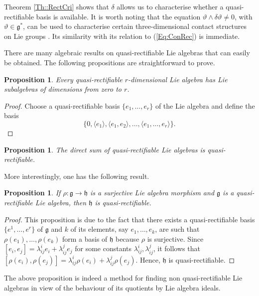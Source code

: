 \documentclass[12pt]{article}
\theoremstyle{plain}
\newtheorem{proposition}[theorem]{Proposition}
\theoremstyle{definition}
\numberwithin{equation}{section}
\begin{document}
Theorem \ref{Th::RectCri} shows that $\delta$ allows us to characterise whether a quasi-rectifiable basis is available. It is worth noting that the equation $\vartheta\wedge \delta \vartheta \neq 0$, with $\vartheta\in \mathfrak{g}^*$, can be used to characterise certain three-dimensional contact structures on Lie groups \cite{LR22}. Its similarity with its relation to (\ref{Eq:ConRec}) is immediate.


There are many algebraic results on quasi-rectifiable Lie algebras that can easily be obtained.  The following propositions are straightforward to prove.

\begin{proposition} Every quasi-rectifiable $r$-dimensional Lie algebra has Lie subalgebras of dimensions from zero to $r$.
\end{proposition}
\begin{proof}
Choose a quasi-rectifiable basis $\{e_1,\ldots,e_r\}$ of the Lie algebra and define the basis
$$
\{0,\langle e_1\rangle, \langle e_1,e_2\rangle,\ldots,\langle e_1,\ldots,e_r\rangle\}.
$$\end{proof}

\begin{proposition} The direct sum of quasi-rectifiable Lie algebras is quasi-rectifiable.
\end{proposition}

More interestingly, one has the following result.

\begin{proposition} If $\rho:\mathfrak{g}\rightarrow \mathfrak{h}$ is a surjective Lie algebra morphism and $\mathfrak{g}$ is a quasi-rectifiable Lie algebra, then $\mathfrak{h}$ is quasi-rectifiable.
\end{proposition}
\begin{proof} This proposition is due to the fact that there exists a quasi-rectifiable basis $\{e^1,\ldots, e^r\}$ of $\mathfrak{g}$ and $k$ of its elements, say $e_1,\ldots,e_k$, are such that $\rho(e_1),\ldots,\rho(e_k)$ form a basis of $\mathfrak{h}$ because $\rho$ is surjective. Since $[e_i,e_j]=\lambda_{ij}^ie_i+\lambda_{ij}^je_j$ for some constants $\lambda_{ij}^i,\lambda_{ij}^j$, it follows that $[\rho(e_i),\rho(e_j)]=\lambda_{ij}^i\rho(e_i)+\lambda_{ij}^j\rho(e_j)$. Hence, $\mathfrak{h}$ is quasi-rectifiable.
\end{proof}

The above proposition is indeed a method for finding non quasi-rectifiable Lie algebras in view of the behaviour of its quotients by Lie algebra ideals. 
\end{document}
